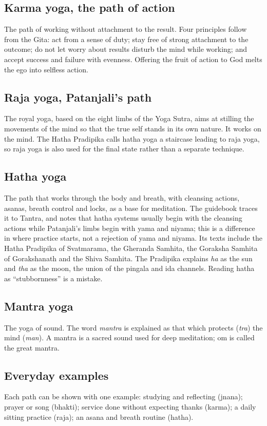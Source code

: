 \subsection*{Karma yoga, the path of action}
The path of working without attachment to the result. Four principles follow from the Gita: act from a sense of duty; stay free of strong attachment to the outcome; do not let worry about results disturb the mind while working; and accept success and failure with evenness. Offering the fruit of action to God melts the ego into selfless action.

\subsection*{Raja yoga, Patanjali's path}
The royal yoga, based on the eight limbs of the Yoga Sutra, aims at stilling the movements of the mind so that the true self stands in its own nature. It works on the mind. The Hatha Pradipika calls hatha yoga a staircase leading to raja yoga, so raja yoga is also used for the final state rather than a separate technique.

\subsection*{Hatha yoga}
The path that works through the body and breath, with cleansing actions, asanas, breath control and locks, as a base for meditation. The guidebook traces it to Tantra, and notes that hatha systems usually begin with the cleansing actions while Patanjali's limbs begin with yama and niyama; this is a difference in where practice starts, not a rejection of yama and niyama. Its texts include the Hatha Pradipika of Svatmarama, the Gheranda Samhita, the Goraksha Samhita of Gorakshanath and the Shiva Samhita. The Pradipika explains \emph{ha} as the sun and \emph{tha} as the moon, the union of the pingala and ida channels. Reading hatha as ``stubbornness'' is a mistake.

\subsection*{Mantra yoga}
The yoga of sound. The word \emph{mantra} is explained as that which protects (\emph{tra}) the mind (\emph{man}). A mantra is a sacred sound used for deep meditation; om is called the great mantra.

\subsection*{Everyday examples}
Each path can be shown with one example: studying and reflecting (jnana); prayer or song (bhakti); service done without expecting thanks (karma); a daily sitting practice (raja); an asana and breath routine (hatha).

